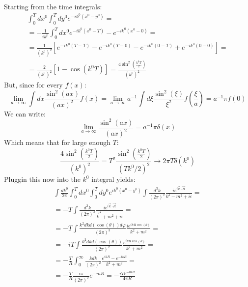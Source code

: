 \documentclass{article}
\begin{document}
Starting from the time integrals:
\begin{equation}
\begin{gathered}
    \int_0^T dx^0 \int_0^T dy^0 e^{-ik^0(x^0 - y^0)} = \\ =
    -\frac{1}{ik^0} \int_0^T dx^0 e^{-ik^0(x^0 - T)} - e^{-ik^0(x^0 - 0)} = \\ =
    \frac{1}{(k^0)^2} \left[
        e^{-ik^0(T - T)} - e^{-ik^0(T - 0)} -
        e^{-ik^0(0 - T)} + e^{-ik^0(0 - 0)}
    \right] = \\ =
    \frac{2}{(k^0)^2} \left[1 - \cos(k^0 T)\right] = \frac{4\sin^2\left(\frac{k^0T}{2}\right)}{(k^0)^2}
\end{gathered}
\end{equation}
But, since for every $f(x)$:
\begin{equation}
    \lim_{a \rightarrow \infty}\int dx \frac{\sin^2(ax)}{(ax)^2}f(x) = 
    \lim_{a \rightarrow \infty} a ^{-1}\int d\xi \frac{\sin^2(\xi)}{\xi^2}f\left(\frac{\xi}{a}\right) = a^{-1} \pi f(0)
\end{equation}
We can write:
\begin{equation}
    \lim_{a \rightarrow \infty}\frac{\sin^2(ax)}{(ax)^2} = a^{-1}\pi \delta(x)
\end{equation}
Which means that for large enough $T$:
\begin{equation}
    \frac{4\sin^2\left(\frac{k^0T}{2}\right)}{(k^0)^2} =
    T^2\frac{\sin^2\left(\frac{k^0T}{2}\right)}{(T k^0/2)^2} \rightarrow 2\pi T \delta(k^0)
\end{equation}
Pluggin this now into the $k^0$ integral yields:
\begin{equation}
\begin{gathered}
    \int \frac{dk^0}{2\pi} \int_0^T dx^0 \int_0^T dy^0 e^{ik^0(x^0 - y^0)} \int \frac{d^3k}{(2\pi)^3} \frac{ie^{i\vec{k}\cdot\vec{R}}}{k^2 - m^2 + i\epsilon} = \\ =
    -T \int \frac{d^3k}{(2\pi)^3} \frac{ie^{i\vec{k}\cdot\vec{R}}}{\vec{k}^2 + m^2 + i\epsilon} = \\ =
    -T \int \frac{k^2 dk d(\cos(\theta)) d\varphi}{(2\pi)^3} \frac{ie^{ikR\cos(\theta)}}{k^2 + m^2} = \\ =
    -iT \int \frac{k^2 dk d(\cos(\theta))}{(2\pi)^2} \frac{e^{ikR\cos(\theta)}}{k^2 + m^2} = \\ =
    -\frac{T}{R} \int_0^\infty \frac{k dk}{(2\pi)^2} \frac{e^{ikR} - e^{-ikR}}{k^2 + m^2} = \\ = -\frac{T}{R}\frac{i\pi}{(2\pi)^2}e^{-mR} = -\frac{iT e^{-mR}}{4\pi R}
\end{gathered}
\end{equation}
\end{document}
